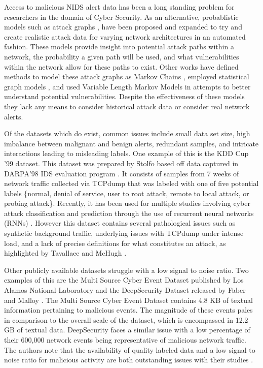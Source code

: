 Access to malicious NIDS alert data has been a long standing problem for researchers in the domain of Cyber Security. As an alternative, probablistic models such as attack graphs \cite{Qin2004, Wang2006, Noel2009}, have been proposed and expanded to try and create realistic attack data for varying network architectures in an automated fashion. These models provide insight into potential attack paths within a network, the probability a given path will be used, and what vulnerabilities within the network allow for these paths to exist. Other works have defined methods to model these attack graphs as Markov Chains \cite{Li2017}, employed statistical graph models \cite{Du2014}, and used Variable Length Markov Models \cite{Fava2008} in attempts to better understand potential vulnerabilities. Despite the effectiveness of these models they lack any means to consider historical attack data or consider real network alerts. 

Of the datasets which do exist, common issues include small data set size, high imbalance between malignant and benign alerts, redundant samples, and intricate interactions leading to misleading labels. One example of this is the KDD Cup '99 \cite{kdd-cup} dataset. This dataset was prepared by Stolfo \etal \cite{Stolfo} based off data captured in DARPA'98 IDS evaluation program \cite{Lippmann}. It consists of samples from 7 weeks of network traffic collected via TCPdump that was labeled with one of five potential labels \{normal, denial of service, user to root attack, remote to local attack, or probing attack\}. Recently, it has been used for multiple studies involving cyber attack classification and prediction through the use of recurrent neural networks (RNNs) \cite{Kim, Staudemeyer}. However this dataset contains several pathological issues such as synthetic background traffic, underlying issues with TCPdump under intense load, and a lack of precise definitions for what constitutes an attack, as highlighted by Tavallaee \etal \cite{Tavallaee} and McHugh \cite{McHugh}.

Other publicly available datasets struggle with a low signal to noise ratio. Two examples of this are the Multi Source Cyber Event Dataset published by Los Alamos National Laboratory \cite{akent-2015-enterprise-data} and the DeepSecurity Dataset released by Faber and Malloy \cite{Faber2018}. The Multi Source Cyber Event Dataset contains 4.8 KB of textual information pertaining to malicious events. The magnitude of these events pales in comparison to the overall scale of the dataset, which is encompassed in 12.2 GB of textual data. DeepSecurity faces a similar issue with a low percentage of their 600,000 network events being representative of malicious network traffic. The authors note that the availability of quality labeled data and a low signal to noise ratio for malicious activity are both outstanding issues with their studies \cite{Faber2018}. 

